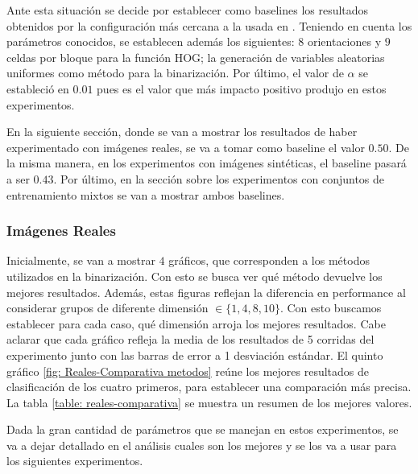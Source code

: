 	Ante esta situación se decide por establecer como baselines los resultados obtenidos por la configuración más cercana a la usada en \cite{wang}. Teniendo en cuenta los parámetros conocidos, se establecen además los siguientes: $8$ orientaciones y $9$ celdas por bloque para la función HOG; la generación de variables aleatorias uniformes como método para la binarización. Por último, el valor de \textit{$\alpha$} se estableció en $0.01$ pues es el valor que más impacto positivo produjo en estos experimentos.

	En la siguiente sección, donde se van a mostrar los resultados de haber experimentado con imágenes reales, se va a tomar como baseline el valor $0.50$. De la misma manera, en los experimentos con imágenes sintéticas, el baseline pasará a ser $0.43$. Por último, en la sección sobre los experimentos con conjuntos de entrenamiento mixtos se van a mostrar ambos baselines.

	\subsubsection{Imágenes Reales}

	Inicialmente, se van a mostrar $4$ gráficos, que corresponden a los métodos utilizados en la binarización. Con esto se busca ver qué método devuelve los mejores resultados. Además, estas figuras reflejan la diferencia en performance al considerar grupos de diferente dimensión $\in \{ 1, 4, 8, 10\}$. Con esto buscamos establecer para cada caso, qué dimensión arroja los mejores resultados. Cabe aclarar que cada gráfico refleja la media de los resultados de 5 corridas del experimento junto con las barras de error a 1 desviación estándar. El quinto gráfico \ref{fig: Reales-Comparativa metodos} reúne los mejores resultados de clasificación de los cuatro primeros, para establecer una comparación más precisa. La tabla \ref{table: reales-comparativa} se muestra un resumen de los mejores valores.

	 Dada la gran cantidad de parámetros que se manejan en estos experimentos, se va a dejar detallado en el análisis cuales son los mejores y se los va a usar para los siguientes experimentos.

